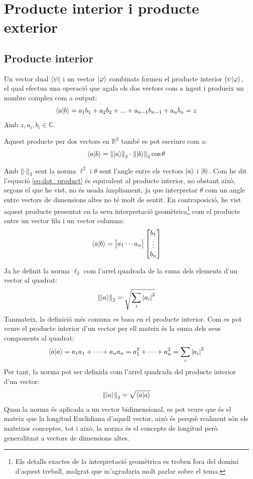 \section{Producte interior i producte exterior}

\subsection{Producte interior}
Un vector dual $\bra{\psi}$ i un vector $\ket{\varphi}$ combinats formen el producte interior $\bra{\psi}\ket{\varphi}$, el qual efectua una operació que agafa els dos vectors com a input i produeix un nombre complex com a output:
$$
\bra{a}\ket{b} = a_1 b_1 + a_2 b_2 + ... + a_{n-1} b_{n-1} + a_n b_n = z
$$
Amb $z, a_i, b_i \in \mathbb{C}$.

Aquest producte per dos vectors en $\mathbb{R}^2$ també es pot escriure com a:
\begin{equation}
	\bra{a}\ket{b} = \norm{\ket{a}}_2 \cdot \norm{\ket{b}}_2 \cos \theta 
	\label{eq:dot_product}
\end{equation}


Amb $\norm{\cdot}_2$ sent la norma $\ell^2$ i $\theta$ sent l'angle entre els vectors $\ket{a}$ i $\ket{b}$. Com he dit l'equació \eqref{eq:dot_product} és equivalent al producte interior, no obstant això, segons el que he vist, no és usada àmpliament, ja que interpretar $\theta$ com un angle entre vectors de dimensions altes no té molt de sentit. En contraposició, he vist aquest producte presentat en la seva interpretació geomètrica\footnote{Els detalls exactes de la interpretació geomètrica es troben fora del domini d'aquest treball, malgrat que m'agradaria molt parlar sobre el tema.} com el producte entre un vector fila i un vector columna:
$$
\bra{a}\ket{b} = \begin{bmatrix}a_1  \cdots  a_n \end{bmatrix} \begin{bmatrix} b_{1} \\ \vdots \\ b_{n} \end{bmatrix}
$$

Ja he definit la norma $\ell_2$ com l'arrel quadrada de la suma dels elements d'un vector al quadrat:
$$
\norm{\ket{a}}_2 = \sqrt{\sum_{i} \abs{a_{i}}^2}
$$
Tanmateix, la definició més comuna es basa en el producte interior. Com es pot veure el producte interior d'un vector per ell mateix és la suma dels seus components al quadrat:
$$
\bra{a}\ket{a} = a_1 a_1 + \cdots + a_n a_n = a_1^2 + \cdots +  a_n^2 \\= \sum_{i} \abs{a_i}^2
$$
Per tant, la norma pot ser definida com l'arrel quadrada del producte interior d'un vector:
\begin{equation}
\norm{\ket{a}}_2 = \sqrt{\bra{a}\ket{a}}
\label{eq:norm}
\end{equation}
Quan la norma és aplicada a un vector bidimensional, es pot veure que és el mateix que la longitud Euclidiana d'aquell vector, això és perquè realment són els mateixos conceptes, tot i això, la norma és el concepte de longitud però generalitzat a vectors de dimensions altes.

